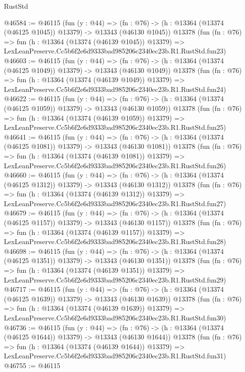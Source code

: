 \begin{lexlean}{RustStd}
\begin{coremodule}
@46584 := @46115
    (fun (y : @44) =>
    (fn : @76) -> (h : @13364 (@13374 (@46125 @1045)) @13379) -> @13343 (@46130 @1045))
    @13378
    (fun (fn : @76) =>
    fun (h : @13364 (@13374 (@46139 @1045)) @13379) =>
    LexLeanPreserve.Cc5b6f2e6d9333bad985206c2340ec23b.R1.RustStd.fun23)
@46603 := @46115
    (fun (y : @44) =>
    (fn : @76) -> (h : @13364 (@13374 (@46125 @1049)) @13379) -> @13343 (@46130 @1049))
    @13378
    (fun (fn : @76) =>
    fun (h : @13364 (@13374 (@46139 @1049)) @13379) =>
    LexLeanPreserve.Cc5b6f2e6d9333bad985206c2340ec23b.R1.RustStd.fun24)
@46622 := @46115
    (fun (y : @44) =>
    (fn : @76) -> (h : @13364 (@13374 (@46125 @1059)) @13379) -> @13343 (@46130 @1059))
    @13378
    (fun (fn : @76) =>
    fun (h : @13364 (@13374 (@46139 @1059)) @13379) =>
    LexLeanPreserve.Cc5b6f2e6d9333bad985206c2340ec23b.R1.RustStd.fun25)
@46641 := @46115
    (fun (y : @44) =>
    (fn : @76) -> (h : @13364 (@13374 (@46125 @1081)) @13379) -> @13343 (@46130 @1081))
    @13378
    (fun (fn : @76) =>
    fun (h : @13364 (@13374 (@46139 @1081)) @13379) =>
    LexLeanPreserve.Cc5b6f2e6d9333bad985206c2340ec23b.R1.RustStd.fun26)
@46660 := @46115
    (fun (y : @44) =>
    (fn : @76) -> (h : @13364 (@13374 (@46125 @1312)) @13379) -> @13343 (@46130 @1312))
    @13378
    (fun (fn : @76) =>
    fun (h : @13364 (@13374 (@46139 @1312)) @13379) =>
    LexLeanPreserve.Cc5b6f2e6d9333bad985206c2340ec23b.R1.RustStd.fun27)
@46679 := @46115
    (fun (y : @44) =>
    (fn : @76) -> (h : @13364 (@13374 (@46125 @1157)) @13379) -> @13343 (@46130 @1157))
    @13378
    (fun (fn : @76) =>
    fun (h : @13364 (@13374 (@46139 @1157)) @13379) =>
    LexLeanPreserve.Cc5b6f2e6d9333bad985206c2340ec23b.R1.RustStd.fun28)
@46698 := @46115
    (fun (y : @44) =>
    (fn : @76) -> (h : @13364 (@13374 (@46125 @1351)) @13379) -> @13343 (@46130 @1351))
    @13378
    (fun (fn : @76) =>
    fun (h : @13364 (@13374 (@46139 @1351)) @13379) =>
    LexLeanPreserve.Cc5b6f2e6d9333bad985206c2340ec23b.R1.RustStd.fun29)
@46717 := @46115
    (fun (y : @44) =>
    (fn : @76) -> (h : @13364 (@13374 (@46125 @1639)) @13379) -> @13343 (@46130 @1639))
    @13378
    (fun (fn : @76) =>
    fun (h : @13364 (@13374 (@46139 @1639)) @13379) =>
    LexLeanPreserve.Cc5b6f2e6d9333bad985206c2340ec23b.R1.RustStd.fun30)
@46736 := @46115
    (fun (y : @44) =>
    (fn : @76) -> (h : @13364 (@13374 (@46125 @1644)) @13379) -> @13343 (@46130 @1644))
    @13378
    (fun (fn : @76) =>
    fun (h : @13364 (@13374 (@46139 @1644)) @13379) =>
    LexLeanPreserve.Cc5b6f2e6d9333bad985206c2340ec23b.R1.RustStd.fun31)
@46755 := @46115

\end{coremodule}
\end{lexlean}
